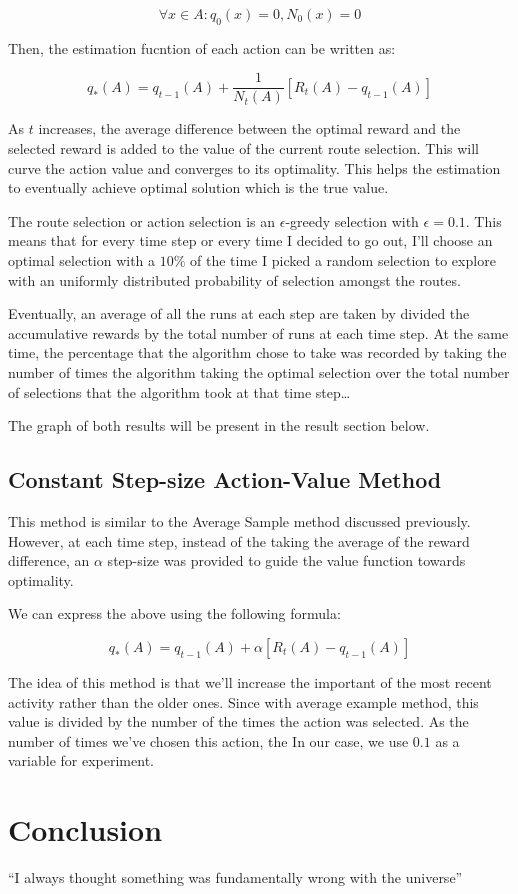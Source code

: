 \documentclass{article}
\begin{document}
\[
  \forall x \in A: q_0(x) = 0, N_0(x) = 0
\]

Then, the estimation fucntion of each action can be written as:

\[
  q_*(A) = q_{t-1}(A) + \frac{1}{N_t(A)}[R_t(A)-q_{t-1}(A)]
\]

As $t$ increases, the average difference between the optimal reward and the selected
reward is added to the value of the current route selection. 
This will curve the action value and converges to its optimality. This helps
the estimation to eventually achieve optimal solution which is the true value.

The route selection or action selection is an $\epsilon$-greedy selection with
$\epsilon=0.1$. This means that for every time step or every time I decided to
go out, I'll choose an optimal selection with a $10\%$ of the time I picked a
random selection to explore with an uniformly distributed probability of
selection amongst the routes.

Eventually, an average of all the runs at each step are taken by divided the
accumulative rewards by the total number of runs at each time step. At the same
time, the percentage that the algorithm chose to take was recorded by taking the
number of times the algorithm taking the optimal selection over the total number
of selections that the algorithm took at that time step\dots

The graph of both results will be present in the result section below.

\subsection{Constant Step-size Action-Value Method}
This method is similar to the Average Sample method discussed previously.
However, at each time step, instead of the taking the average of the reward
difference, an $\alpha$ step-size was provided to guide the value function
towards optimality.

We can express the above using the following formula:

\[
  q_*(A) = q_{t-1}(A) + \alpha[R_t(A)-q_{t-1}(A)]
\]

The idea of this method is that we'll increase the important of the most recent
activity rather than the older ones. Since with average example method, this
value is divided by the number of the times the action was selected. As the
number of times we've chosen this action, the In our case, we use $0.1$ as a variable for experiment.



\section{Conclusion}
``I always thought something was fundamentally wrong with the universe'' \citep{adams1995hitchhiker}



\end{document}
